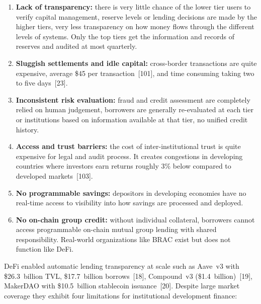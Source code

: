 \documentclass[12pt,a4paper]{report}
\begin{document}
\begin{enumerate}[noitemsep]
\item \textbf{Lack of transparency:} there is very little chance of the lower tier users to verify capital management, reserve levels or lending decisions are made by the higher tiers, very less transparency on how money flows through the different levels of systems. Only the top tiers get the information and records of reserves and audited at most quarterly.
\item \textbf{Sluggish settlements and idle capital:} cross-border transactions are quite expensive, average \$45 per transaction~[101], and time consuming taking two to five days~[23].
\item \textbf{Inconsistent risk evaluation:} fraud and credit assessment are completely relied on human judgement, borrowers are generally re-evaluated at each tier or institutions based on information available at that tier, no unified credit history.
\item \textbf{Access and trust barriers:} the cost of inter-institutional trust is quite expensive for legal and audit process. It creates congestions in developing countries where investors earn returns roughly 3\% below compared to developed markets~[103].
\item \textbf{No programmable savings:} depositors in developing economies have no real-time access to visibility into how savings are processed and deployed.
\item \textbf{No on-chain group credit:} without individual collateral, borrowers cannot access programmable on-chain mutual group lending with shared responsibility. Real-world organizations like BRAC exist but does not function like DeFi.
\end{enumerate}

DeFi enabled automatic lending transparency at scale such as Aave~v3 with \$26.3~billion TVL, \$17.7~billion borrows~[18], Compound~v3 (\$1.4~billion)~[19], MakerDAO with \$10.5~billion stablecoin issuance~[20]. Despite large market coverage they exhibit four limitations for institutional development finance:
\end{document}
